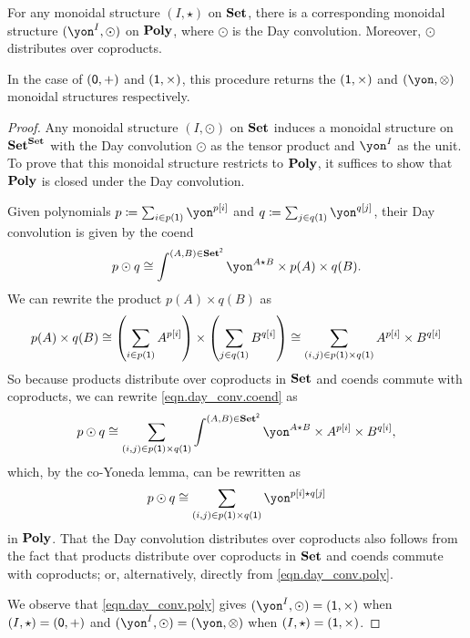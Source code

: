 \documentclass[Book-Poly]{subfiles}
\begin{document}
\begin{proposition} \label{prop.day}
For any monoidal structure $(I,\star)$ on $\mathbf{Set}$, there is a corresponding monoidal structure $(\yon^I, \odot)$ on $\mathbf{Poly}$, where $\odot$ is the Day convolution.
Moreover, $\odot$ distributes over coproducts.

In the case of $(\textsf{0},+)$ and $(\textsf{1},\times)$, this procedure returns the $(\textsf{1},\times)$ and $(\yon,\otimes)$ monoidal structures respectively.
\end{proposition}
\begin{proof}
Any monoidal structure $(I, \odot)$ on $\mathbf{Set}$ induces a monoidal structure on $\mathbf{Set}^{\mathbf{Set}}$ with the Day convolution $\odot$ as the tensor product and $\yon^I$ as the unit.
To prove that this monoidal structure restricts to $\mathbf{Poly}$, it suffices to show that $\mathbf{Poly}$ is closed under the Day convolution.

Given polynomials $p\coloneqq\sum_{i \in p(\1)} \yon^{p[i]}$ and $q\coloneqq\sum_{j \in q(\1)} \yon^{q[j]}$, their Day convolution is given by the coend
\begin{equation} \label{eqn.day_conv.coend}
    p \odot q \iso \int^{(A,B)\in\smset^\2} \yon^{A \star B} \times p(A) \times q(B).
\end{equation}
We can rewrite the product $p(A) \times q(B)$ as
\[
    p(A) \times q(B) \iso \left(\sum_{i \in p(\1)} A^{p[i]}\right) \times \left(\sum_{j \in q(\1)} B^{q[i]}\right) \iso \sum_{(i,j) \in p(\1) \times q(\1)} A^{p[i]} \times B^{q[i]} %
\]
So because products distribute over coproducts in $\mathbf{Set}$ and coends commute with coproducts, we can rewrite \eqref{eqn.day_conv.coend} as
\[
    p \odot q \iso \sum_{(i,j) \in p(\1) \times q(\1)} \int^{(A,B)\in\smset^\2} \yon^{A \star B} \times A^{p[i]} \times B^{q[i]},
\]
which, by the co-Yoneda lemma, can be rewritten as
\begin{equation} \label{eqn.day_conv.poly}
    p \odot q \iso \sum_{(i,j) \in p(\1) \times q(\1)} \yon^{p[i] \star q[j]}
\end{equation}
in $\mathbf{Poly}$.
That the Day convolution distributes over coproducts also follows from the fact that products distribute over coproducts in $\mathbf{Set}$ and coends commute with coproducts; or, alternatively, directly from \eqref{eqn.day_conv.poly}.

We observe that \eqref{eqn.day_conv.poly} gives $(\yon^I, \odot) = (\1, \times)$ when $(I, \star) = (\textsf{0}, +)$ and $(\yon^I, \odot) = (\yon, \otimes)$ when $(I, \star) = (\textsf{1}, \times)$.
\end{proof}
\end{document}
